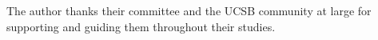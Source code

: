The author thanks their committee and the UCSB community at large for supporting and guiding them throughout their studies.
